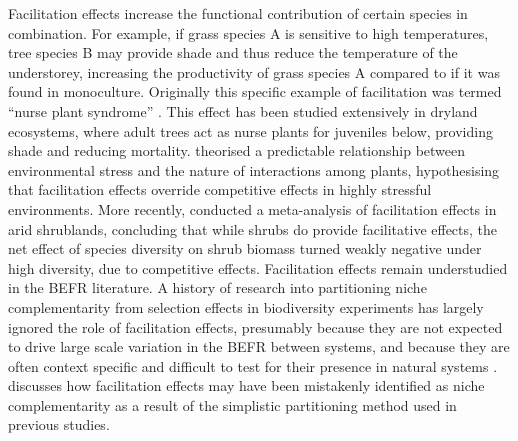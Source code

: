 \begin{refsection}
Facilitation effects increase the functional contribution of certain species in combination. For example, if grass species A is sensitive to high temperatures, tree species B may provide shade and thus reduce the temperature of the understorey, increasing the productivity of grass species A compared to if it was found in monoculture. Originally this specific example of facilitation was termed ``nurse plant syndrome'' \citep{Padilla2006}. This effect has been studied extensively in dryland ecosystems, where adult trees act as nurse plants for juveniles below, providing shade and reducing mortality. \citet{Callaway1997, Good2014, Weltzin1999} theorised a predictable relationship between environmental stress and the nature of interactions among plants, hypothesising that facilitation effects override competitive effects in highly stressful environments. More recently, \citet{Lortie2021} conducted a meta-analysis of facilitation effects in arid shrublands, concluding that while shrubs do provide facilitative effects, the net effect of species diversity on shrub biomass turned weakly negative under high diversity, due to competitive effects. Facilitation effects remain understudied in the BEFR literature. A history of research into partitioning niche complementarity from selection effects in biodiversity experiments has largely ignored the role of facilitation effects, presumably because they are not expected to drive large scale variation in the BEFR between systems, and because they are often context specific and difficult to test for their presence in natural systems \citep{Wright2017}. \citet{Wright2021} discusses how facilitation effects may have been mistakenly identified as niche complementarity as a result of the simplistic partitioning method used in previous studies.


\end{refsection}
